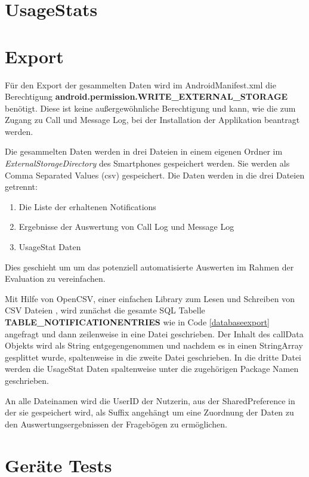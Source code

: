 \section{UsageStats}

\section{Export}

Für den Export der gesammelten Daten wird im AndroidManifest.xml die Berechtigung \textbf{android.permission.WRITE\_EXTERNAL\_STORAGE}
benötigt. 
Diese ist keine außergewöhnliche Berechtigung und kann, wie die zum Zugang zu Call und Message Log, bei der Installation der Applikation beantragt werden.
\par
Die gesammelten Daten werden in drei Dateien in einem eigenen Ordner im \emph{ExternalStorageDirectory} des Smartphones gespeichert werden.
Sie werden als Comma Separated Values (csv) gespeichert.
Die Daten werden in die drei Dateien getrennt:

\begin{enumerate}
  \item Die Liste der erhaltenen Notifications
  \item Ergebnisse der Auswertung von Call Log und Message Log
  \item UsageStat Daten
\end{enumerate}

Dies geschieht um um das potenziell automatisierte Auswerten im Rahmen der Evaluation zu vereinfachen.
\par

Mit Hilfe von OpenCSV, einer einfachen Library zum Lesen und Schreiben von CSV Dateien \cite{opencsv},
wird zunächst die gesamte SQL Tabelle \textbf{TABLE\_NOTIFICATIONENTRIES} wie in Code \ref{databaseexport} angefragt und dann zeilenweise in eine Datei geschrieben.
Der Inhalt des callData Objekts wird als String entgegengenommen und nachdem es in einen StringArray gesplittet wurde, spaltenweise in die zweite Datei geschrieben.
In die dritte Datei werden die UsageStat Daten spaltenweise unter die zugehörigen Package Namen geschrieben.
\par
An alle Dateinamen wird die UserID der Nutzerin, aus der SharedPreference in der sie gespeichert wird, als Suffix angehängt um eine Zuordnung der Daten zu den Auswertungsergebnissen der Fragebögen zu ermöglichen.


\section{Geräte Tests}


